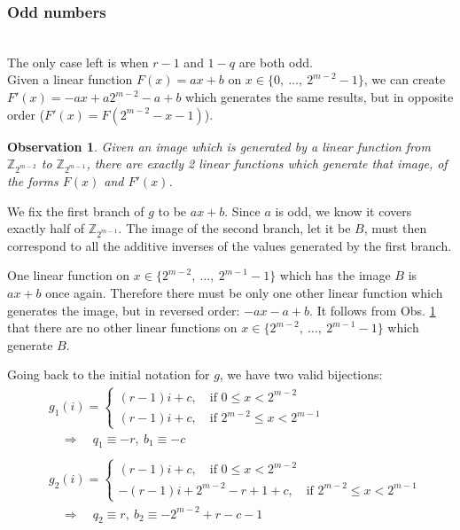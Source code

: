 \documentclass[11pt]{llncs}
\newtheorem{observation}[theorem]{Observation}
\begin{document}
\subsubsection{Odd numbers}\hfill\\
The only case left is when $r-1$ and $1-q$ are both odd.\\

Given a linear function $F(x)=ax+b$ on $x \in \{0,\ \dots,\ 2^{m-2}-1\}$, we can create $F'(x)=-ax+a2^{m-2}-a+b$ which generates the same results, but in opposite order ($F'(x) = F(2^{m-2}-x-1)$).

\begin{observation}\label{two-linear}
Given an image which is generated by a linear function from $\mathbb{Z}_{2^{m-2}}$ to $\mathbb{Z}_{2^{m-1}}$, there are exactly 2 linear functions which generate that image, of the forms $F(x)$ and $F'(x)$.
\end{observation}

We fix the first branch of $g$ to be $ax+b$. Since $a$ is odd, we know it covers exactly half of $\mathbb{Z}_{2^{m-1}}$. The image of the second branch, let it be $B$, must then correspond to all the additive inverses of the values generated by the first branch.

One linear function on $x \in \{2^{m-2},\ \dots,\ 2^{m-1}-1\}$  which has the image $B$ is ${ax+b}$ once again. Therefore there must be only one other linear function which generates the image, but in reversed order: $-ax-a+b$. It follows from Obs. \ref{two-linear} that there are no other linear functions on $x \in \{2^{m-2},\ \dots,\ 2^{m-1}-1\}$ which generate $B$.

Going back to the initial notation for $g$, we have two valid bijections:
\[ \begin{aligned}
& g_1(i) = \begin{cases}
	(r-1)i + c,\quad\text{if }0 \leq x < 2^{m-2} \\
	(r-1)i + c,\quad\text{if }2^{m-2} \leq x < 2^{m-1} 
\end{cases} \\
& \quad\Rightarrow\quad q_1 \equiv -r,\ b_1 \equiv -c \\\\
&g_2(i) = \begin{cases}
	(r-1)i + c,\quad\text{if }0 \leq x < 2^{m-2} \\
	-(r-1)i + 2^{m-2} -r+1+c,\quad\text{if }2^{m-2} \leq x < 2^{m-1}
\end{cases} \\
& \quad\Rightarrow\quad q_2 \equiv r,\ b_2 \equiv -2^{m-2}+r-c-1
\end{aligned} \]
\end{document}
